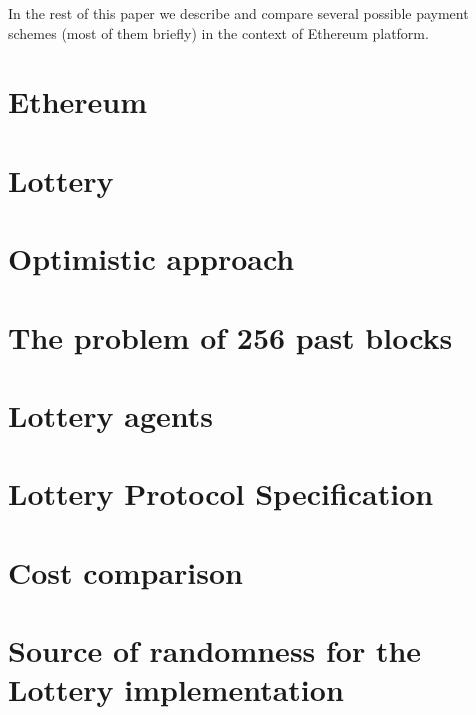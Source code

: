 \documentclass[a4paper]{article}
\begin{document}
In the rest of this paper we describe and compare several possible payment schemes (most of them briefly) in the context of Ethereum platform.

\section{Ethereum}
\section{Lottery}
\section{Optimistic approach}
\section{The problem of 256 past blocks}
\section{Lottery agents}
\section{Lottery Protocol Specification}
\section{Cost comparison}
\section{Source of randomness for the Lottery implementation}
\end{document}
